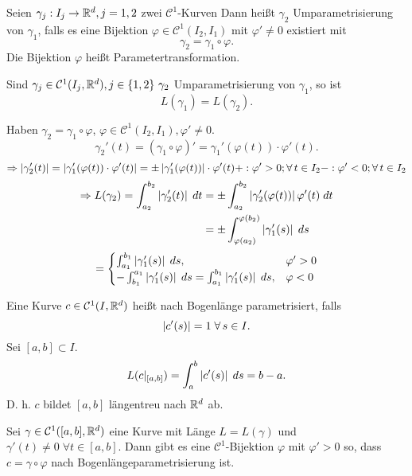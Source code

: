\documentclass[../ana2.tex]{subfiles}
\begin{document}
\begin{defi}[Umparametrisierung]
    Seien \(\abb{\gamma_j}{I_j}{\R^d}, j=1,2 \) zwei \(\mathcal{C}^1\)-Kurven
    Dann heißt \(\gamma_2\) Umparametrisierung von \( \gamma_1 \),
    falls es eine Bijektion \(\varphi \in \mathcal{C}^1(I_2, I_1)\)
    mit \(\varphi' \neq 0 \) existiert mit 
    \[ \gamma_2 = \gamma_1 \circ \varphi. \]
    Die Bijektion \( \varphi \) heißt Parametertransformation.
\end{defi}
\begin{lem}
    Sind \(\gamma_j \in \mathcal{C}^1(I_j, \R^d), 
    j \in \set{1,2}\ \gamma_2\) Umparametrisierung  
    von \( \gamma_1 \), so ist 
    \[ L(\gamma_1) = L(\gamma_2). \]
\end{lem}
\begin{bew}
    Haben \( \gamma_2 = \gamma_1 \circ \varphi \), \( \varphi \in \mathcal{C}^1(I_2, I_1), 
    \varphi' \neq 0 \).
    \[ \gamma_2'(t) = (\gamma_1 \circ \varphi)' 
    = \gamma_1'(\varphi(t)) \cdot \varphi'(t). \]
    \[ \Rightarrow \abs{\gamma_2'(t)} 
    = \abs{\gamma'_1(\varphi(t)) \cdot \varphi'(t)} 
    = \pm \abs{\gamma'_1(\varphi(t))} \cdot \varphi'(t) \\
    +: \varphi'> 0;\forall t \in I_2 \\
    -: \varphi'< 0;\forall t \in I_2 \]
    \begin{align*}
        \Rightarrow L(\gamma_2) = \integralx{\abs{ \gamma_2'(t) }}{a_2}{b_2}{t}
        &= \pm \integralx{\abs{\gamma_2'(\varphi(t))} \varphi'(t) }{a_2}{b_2}{t} \\
        &= \pm \integralx{\abs{\gamma_1'(s)}}{\varphi(a_2)}{\varphi(b_2)}{s}
    \end{align*}
    \[ = \begin{cases}
        \integralx{\abs{ \gamma_1'(s) }}{a_1}{b_1}{s}, & \varphi' > 0 \\
        - \integralx{\abs{\gamma_1'(s)}}{b_1}{a_1}{s} 
        = \integralx{\abs{\gamma_1'(s)}}{a_1}{b_1}{s}, & \varphi < 0 
    \end{cases}\]
\end{bew}
\begin{defi}
    Eine Kurve \(c \in \mathcal{C}^1(I, \R^d)\) heißt nach Bogenlänge
    parametrisiert, falls
    \[ \abs{c'(s)} = 1 \; \forall s \in I. \]
    Sei \( [a,b] \subset I \).
    \[ L(c \vert_{[a,b]}) = \integralx{\abs{c'(s)}}{a}{b}{s}
    = b - a. \]
    D. h. \(c\) bildet \([a,b]\) längentreu nach \(\R^d\) ab.
\end{defi}
\begin{satz}
    Sei \( \gamma \in \mathcal{C}^1([a,b],\R^d) \) eine Kurve 
    mit Länge \(L = L(\gamma)\) und \(\gamma'(t) \neq 0 \; \forall t \in [a,b] \).
    Dann gibt es eine \(\mathcal{C}^1\)-Bijektion \(\varphi\) 
    mit \( \varphi' > 0 \) so, dass \(c = \gamma \circ \varphi\) nach 
    Bogenlängeparametrisierung ist.
\end{satz}
\end{document}
